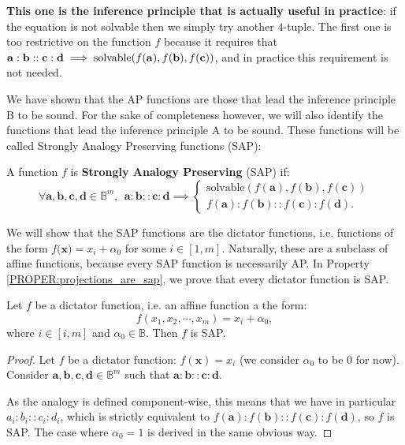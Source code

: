 \textbf{This one is the inference principle that is actually useful in
practice}: if the
equation is not solvable then we simply try another $4$-tuple. The first one is
too restrictive on the function $f$ because it requires that $\mathbf{a} :
\mathbf{b} :: \mathbf{c} : \mathbf{d} \implies  \text{solvable}(f(\mathbf{a}),
f(\mathbf{b}), f(\mathbf{c}))$, and in practice this requirement is not
needed.

We have shown that the AP functions are those that lead the inference
principle B to be sound.  For the sake of completeness however, we will also
identify the functions that lead the inference principle A to be sound. These
functions will be called Strongly Analogy Preserving functions (SAP):

\begin{definition}
  A function $f$ is \textbf{Strongly Analogy Preserving} (SAP) if:
  $$\forall \mathbf{a}, \mathbf{b}, \mathbf{c}, \mathbf{d} \in \mathbb{B}^m, ~~
  \mathbf{a}: \mathbf{b}:: \mathbf{c}: \mathbf{d} \implies
  \begin{cases}
    \text{solvable}(f(\mathbf{a}), f(\mathbf{b}), f(\mathbf{c}))\\
     f(\mathbf{a}) : f(\mathbf{b}) :: f(\mathbf{c}) : f(\mathbf{d}).
  \end{cases}$$
\end{definition}

We will show that the SAP functions are the dictator functions, i.e. functions
of the form $f(\mathbf{x)} = x_i + \alpha_0$ for some $i \in [1, m]$.
Naturally, these are a subclass of affine functions, because every SAP function
is necessarily AP. In Property \ref{PROPER:projections_are_sap}, we prove that
every dictator function  is SAP.

\begin{property}
  \label{PROPER:projections_are_sap}
  Let $f$ be a dictator function, i.e. an affine function a the form:
  $$f(x_1, x_2, \cdots, x_m) = x_i + \alpha_0,$$
  where $i \in [i, m]$ and $\alpha_0 \in \mathbb{B}$. Then $f$ is SAP.
\end{property}
\begin{proof}
  Let $f$ be a dictator function: $f(\mathbf{x}) = x_i$ (we consider $\alpha_0$
  to be $0$ for now). Consider $\mathbf{a}, \mathbf{b}, \mathbf{c}, \mathbf{d}
  \in \mathbb{B}^m$ such that $\mathbf{a}: \mathbf{b}:: \mathbf{c}:
  \mathbf{d}$.

  As the analogy is defined component-wise, this means that we have in
  particular $a_i : b_i :: c_i : d_i$, which is strictly equivalent to
  $f(\mathbf{a}) : f(\mathbf{b}) :: f(\mathbf{c}) : f(\mathbf{d})$, so $f$ is
  SAP. The case where $\alpha_0 = 1$ is derived in the same obvious way.
\end{proof}

